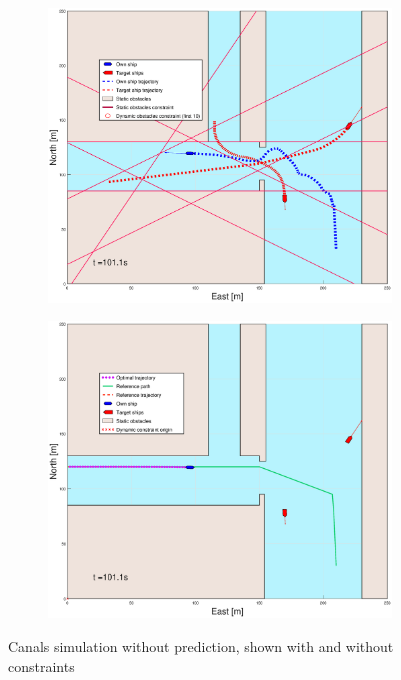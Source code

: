\begin{figure}[ht]
\begin{subfigure}[b]{0.499\textwidth}
    \end{subfigure}
    \hfill
    \\
    \begin{subfigure}[b]{0.49\textwidth}
        \centering
        \includegraphics[width=\textwidth]{Images/Figures/Havn1/_Simple_1fig1_time=101}
    \end{subfigure}
    \hfill
    \begin{subfigure}[b]{0.499\textwidth}
        \centering
        \includegraphics[width=\textwidth]{Images/Figures/Havn1/_Simple_1fig999_time=101}
    \end{subfigure}
    \hfill
    \caption{Canals simulation without prediction, shown with and without constraints}
\end{figure}
